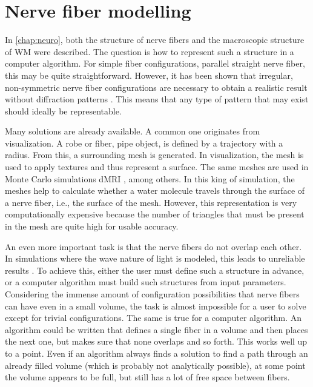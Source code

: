 \setcounter{chapter}{3}
\chapter{Nerve fiber modelling}
\label{chap:sof:modelling}
%
\par
In \cref{chap:neuro}, both the structure of nerve fibers and the macroscopic structure of \ac{WM} were described.
The question is how to represent such a structure in a computer algorithm.
For simple fiber configurations, \eg{} parallel straight nerve fiber, this may be quite straightforward.
However, it has been shown that irregular, non-symmetric nerve fiber configurations are necessary to obtain a realistic result without diffraction patterns \cite{MenzelDissertation}.
This means that any type of pattern that may exist should ideally be representable.
\par
%
Many solutions are already available.
A common one originates from visualization.
A robe or fiber, \ie{} pipe object, is defined by a trajectory with a radius.
From this, a surrounding mesh is generated.
In visualization, the mesh is used to apply textures and thus represent a surface.
The same meshes are used in Monte Carlo simulations \ac{dMRI} \cite{Ginsburger2019,ginsburgerDis2019}, among others.
In this king of simulation, the meshes help to calculate whether a water molecule travels through the surface of a nerve fiber, i.e., the surface of the mesh.
However, this representation is very computationally expensive because the number of triangles that must be present in the mesh are quite high for usable accuracy.
\par
%
An even more important task is that the nerve fibers do not overlap each other.
%
In simulations where the wave nature of light is modeled, this leads to unreliable results \cite{MenzelDissertation}.
To achieve this, either the user must define such a structure in advance, or a computer algorithm must build such structures from input parameters.
Considering the immense amount of configuration possibilities that nerve fibers can have even in a small volume, the task is almost impossible for a user to solve except for trivial configurations.
The same is true for a computer algorithm.
An algorithm could be written that defines a single fiber in a volume and then places the next one, but makes sure that none overlaps and so forth.
This works well up to a point.
Even if an algorithm always finds a solution to find a path through an already filled volume (which is probably not analytically possible), at some point the volume appears to be full, but still has a lot of free space between fibers.
